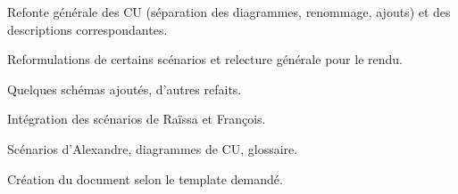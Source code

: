 
Refonte générale des CU (séparation des diagrammes, renommage, ajouts) et des descriptions correspondantes.
\par
{}
Reformulations de certains scénarios et relecture générale pour le rendu.
\par
{}
Quelques schémas ajoutés, d'autres refaits.
\par
{}
Intégration des scénarios de Raïssa et François.
\par
{} 
Scénarios d'Alexandre, diagrammes de CU, glossaire.
\par
{} 
Création du document selon le template demandé.
\par
